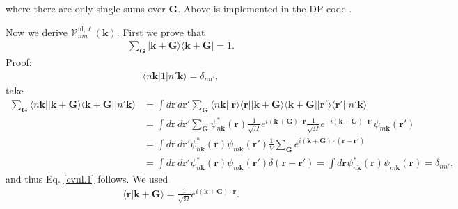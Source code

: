 where there are only single sums over $\mathbf{G}$. Above is implemented in the
DP code \cite{olevanoDP}.

Now we derive $\boldsymbol{\mathcal{V}}^{\mathrm{nl},\ell}_{nm}(\mathbf{k})$. First we prove that
\begin{align}\label{cvnl.1}
\sum_{\mathbf{G}}
\vert\mathbf{k}+\mathbf{G}\rangle\langle\mathbf{k}+\mathbf{G}\vert
=1
.
\end{align}
\noindent Proof:
\begin{align}\label{cvnl.2}
\langle n\mathbf{k}\vert 1\vert n'\mathbf{k}\rangle=\delta_{nn'}
,
\end{align}
take
\begin{align}\label{cvnl.3}
\sum_\mathbf{G} \langle n\mathbf{k}\vert \vert\mathbf{k}+\mathbf{G}\rangle\langle\mathbf{k}+\mathbf{G}\vert\vert n'\mathbf{k}\rangle
&=
\int d\mathbf{r}\,d\mathbf{r}' 
\sum_\mathbf{G} \langle n\mathbf{k}\vert 
\vert\mathbf{r}\rangle\langle\mathbf{r}\vert
\vert\mathbf{k}+\mathbf{G}\rangle\langle\mathbf{k}+\mathbf{G}\vert
\vert\mathbf{r}'\rangle\langle\mathbf{r}'\vert
\vert n'\mathbf{k}\rangle
\nonumber\\
&=
\int d\mathbf{r}\,d\mathbf{r}' 
\sum_\mathbf{G} 
\psi^{*}_{n\mathbf{k}}(\mathbf{r}) 
\frac{1}{\sqrt{\Omega}}e^{i(\mathbf{k}+\mathbf{G})\cdot\mathbf{r}}
\frac{1}{\sqrt{\Omega}}e^{-i(\mathbf{k}+\mathbf{G})\cdot\mathbf{r}'}
\psi_{m\mathbf{k}}(\mathbf{r}') 
\nonumber\\
&=
\int d\mathbf{r}\,d\mathbf{r}' 
\psi^{*}_{n\mathbf{k}}(\mathbf{r}) 
\psi_{m\mathbf{k}}(\mathbf{r}') 
\frac{1}{V}
\sum_\mathbf{G} 
e^{i(\mathbf{k}+\mathbf{G})\cdot(\mathbf{r}-\mathbf{r}')}
\nonumber\\
&=
\int d\mathbf{r}\,d\mathbf{r}' 
\psi^{*}_{n\mathbf{k}}(\mathbf{r}) 
\psi_{m\mathbf{k}}(\mathbf{r}') 
\delta(\mathbf{r}-\mathbf{r}')
=
\int d\mathbf{r}
\psi^{*}_{n\mathbf{k}}(\mathbf{r}) 
\psi_{m\mathbf{k}}(\mathbf{r})=\delta_{nn'} ,
\end{align}
and thus Eq. \eqref{cvnl.1} follows. We used
\begin{align}\label{vnl.4}
\langle\mathbf{r}\vert\mathbf{k}+\mathbf{G}\rangle=\frac{1}{\sqrt{\Omega}}e^{i(\mathbf{k}+\mathbf{G})\cdot\mathbf{r}}.
\end{align}

